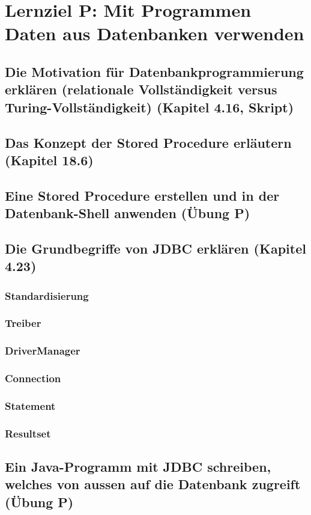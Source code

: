 \section{Lernziel P: Mit Programmen Daten aus Datenbanken verwenden}

\subsection{Die Motivation für Datenbankprogrammierung erklären (relationale Vollständigkeit versus Turing-Vollständigkeit) (Kapitel 4.16, Skript)}

\subsection{Das Konzept der Stored Procedure erläutern (Kapitel 18.6)}

\subsection{Eine Stored Procedure erstellen und in der Datenbank-Shell anwenden (Übung P)}

\subsection{Die Grundbegriffe von JDBC erklären (Kapitel 4.23)}

\subsubsection{Standardisierung}

\subsubsection{Treiber}

\subsubsection{DriverManager}

\subsubsection{Connection}

\subsubsection{Statement}

\subsubsection{Resultset}

\subsection{Ein Java-Programm mit JDBC schreiben, welches von aussen auf die Datenbank zugreift (Übung P)}